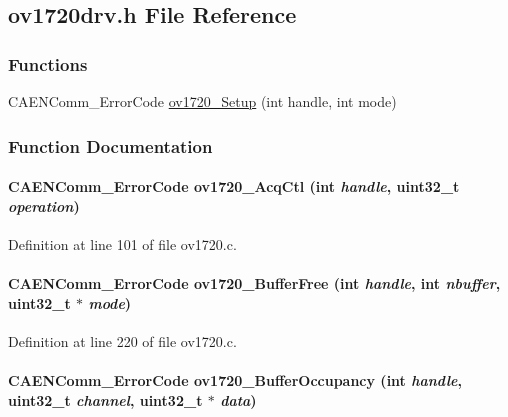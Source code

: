 \subsection{ov1720drv.h File Reference}
\label{ov1720drv_8h}
\subsubsection*{Functions}
\begin{DoxyCompactItemize}
\item 
CAENComm\_\-ErrorCode \hyperlink{ov1720drv_8h_a31f37ce79cfd3a277fcc2856b027ef85}{ov1720\_\-Setup} (int handle, int mode)
\end{DoxyCompactItemize}


\subsubsection{Function Documentation}
\paragraph[{ov1720\_\-AcqCtl}]{\setlength{\rightskip}{0pt plus 5cm}CAENComm\_\-ErrorCode ov1720\_\-AcqCtl (int {\em handle}, \/  uint32\_\-t {\em operation})}\hfill\label{ov1720drv_8h_a283d9c293f1936fa51128298980aa6ff}


Definition at line 101 of file ov1720.c.
\paragraph[{ov1720\_\-BufferFree}]{\setlength{\rightskip}{0pt plus 5cm}CAENComm\_\-ErrorCode ov1720\_\-BufferFree (int {\em handle}, \/  int {\em nbuffer}, \/  uint32\_\-t $\ast$ {\em mode})}\hfill\label{ov1720drv_8h_a3c45a9b83fe184343eb075da778ce4e9}


Definition at line 220 of file ov1720.c.
\paragraph[{ov1720\_\-BufferOccupancy}]{\setlength{\rightskip}{0pt plus 5cm}CAENComm\_\-ErrorCode ov1720\_\-BufferOccupancy (int {\em handle}, \/  uint32\_\-t {\em channel}, \/  uint32\_\-t $\ast$ {\em data})}\hfill\label{ov1720drv_8h_adb987e7cb8af28956e30acfe6f15df15}


